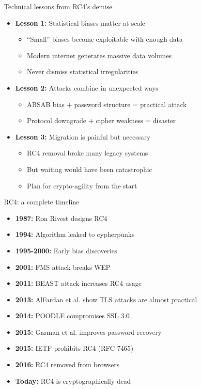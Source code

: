 \documentclass[aspectratio=169, lualatex, handout]{beamer}
\begin{document}
\begin{frame}{Technical lessons from RC4's demise}
	\begin{itemize}[<+->]
		\item \textbf{Lesson 1:} Statistical biases matter at scale
		      \begin{itemize}[<+->]
			      \item ``Small'' biases become exploitable with enough data
			      \item Modern internet generates massive data volumes
			      \item Never dismiss statistical irregularities
		      \end{itemize}
		\item \textbf{Lesson 2:} Attacks combine in unexpected ways
		      \begin{itemize}[<+->]
			      \item ABSAB bias + password structure = practical attack
			      \item Protocol downgrade + cipher weakness = disaster
		      \end{itemize}
		\item \textbf{Lesson 3:} Migration is painful but necessary
		      \begin{itemize}[<+->]
			      \item RC4 removal broke many legacy systems
			      \item But waiting would have been catastrophic
			      \item Plan for crypto-agility from the start
		      \end{itemize}
	\end{itemize}
\end{frame}

\begin{frame}{RC4: a complete timeline}
	\begin{itemize}[<+->]
		\item \textbf{1987:} Ron Rivest designs RC4
		\item \textbf{1994:} Algorithm leaked to cypherpunks
		\item \textbf{1995-2000:} Early bias discoveries
		\item \textbf{2001:} FMS attack breaks WEP
		\item \textbf{2011:} BEAST attack increases RC4 usage
		\item \textbf{2013:} AlFardan et al. show TLS attacks are almost practical
		\item \textbf{2014:} POODLE compromises SSL 3.0
		\item \textbf{2015:} Garman et al. improves password recovery
		\item \textbf{2015:} IETF prohibits RC4 (RFC 7465)
		\item \textbf{2016:} RC4 removed from browsers
		\item \textbf{Today:} RC4 is cryptographically dead
	\end{itemize}
\end{frame}
\end{document}
